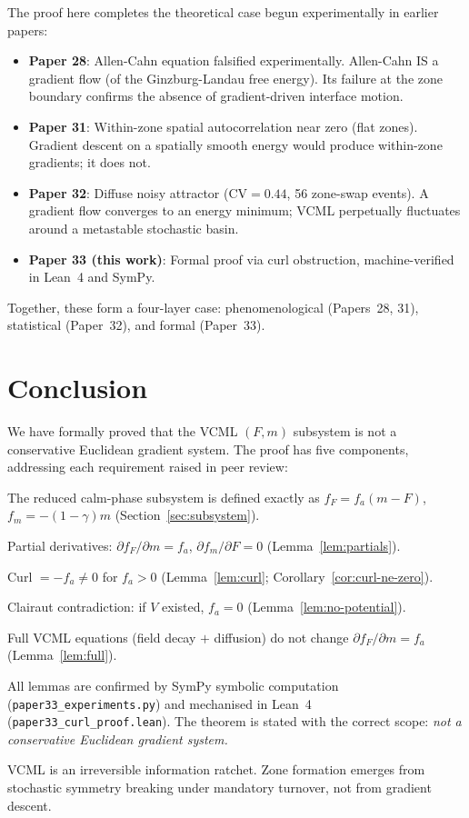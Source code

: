 \documentclass[11pt,a4paper]{article}
\begin{document}
The proof here completes the theoretical case begun experimentally in
earlier papers:

\begin{itemize}[noitemsep]
  \item \textbf{Paper 28}: Allen-Cahn equation falsified experimentally.
    Allen-Cahn IS a gradient flow (of the Ginzburg-Landau free energy).
    Its failure at the zone boundary confirms the absence of gradient-driven
    interface motion.
  \item \textbf{Paper 31}: Within-zone spatial autocorrelation near zero
    (flat zones).  Gradient descent on a spatially smooth energy would produce
    within-zone gradients; it does not.
  \item \textbf{Paper 32}: Diffuse noisy attractor ($\mathrm{CV}=0.44$,
    56 zone-swap events).
    A gradient flow converges to an energy minimum;
    VCML perpetually fluctuates around a metastable stochastic basin.
  \item \textbf{Paper 33 (this work)}: Formal proof via curl obstruction,
    machine-verified in Lean~4 and SymPy.
\end{itemize}

Together, these form a four-layer case: phenomenological (Papers~28, 31),
statistical (Paper~32), and formal (Paper~33).

\section{Conclusion}
\label{sec:conclusion}

We have formally proved that the VCML $(F, m)$ subsystem is not a
conservative Euclidean gradient system.
The proof has five components, addressing each requirement raised in
peer review:
\begin{description}[noitemsep]
  \item[L1] The reduced calm-phase subsystem is defined exactly as
    $f_F = f_a(m-F)$, $f_m = -(1-\gamma)m$ (Section~\ref{sec:subsystem}).
  \item[L2] Partial derivatives: $\partial f_F/\partial m = f_a$,
    $\partial f_m/\partial F = 0$ (Lemma~\ref{lem:partials}).
  \item[L3] Curl $= -f_a \neq 0$ for $f_a > 0$ (Lemma~\ref{lem:curl};
    Corollary~\ref{cor:curl-ne-zero}).
  \item[L4] Clairaut contradiction: if $V$ existed,
    $f_a = 0$ (Lemma~\ref{lem:no-potential}).
  \item[L5] Full VCML equations (field decay $+$ diffusion)
    do not change $\partial f_F/\partial m = f_a$
    (Lemma~\ref{lem:full}).
\end{description}
All lemmas are confirmed by SymPy symbolic computation
(\texttt{paper33\_experiments.py}) and mechanised in Lean~4
(\texttt{paper33\_curl\_proof.lean}).
The theorem is stated with the correct scope:
\emph{not a conservative Euclidean gradient system.}

VCML is an irreversible information ratchet.
Zone formation emerges from stochastic symmetry breaking under
mandatory turnover, not from gradient descent.
\end{document}
